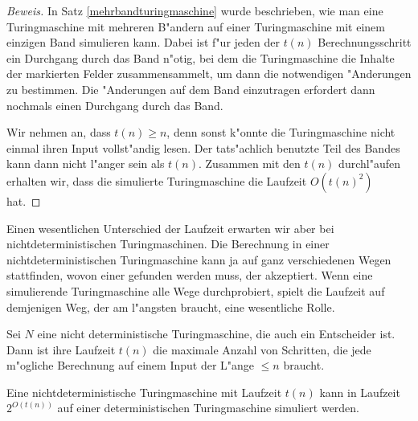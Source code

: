 \begin{proof}[Beweis]
In Satz \ref{mehrbandturingmaschine} wurde beschrieben, wie man eine
Turingmaschine mit mehreren B"andern auf einer Turingmaschine mit
einem einzigen Band simulieren kann. Dabei ist f"ur jeden der
$t(n)$ Berechnungsschritt ein Durchgang durch das Band n"otig, bei
dem die Turingmaschine die Inhalte der markierten Felder zusammensammelt,
um dann die notwendigen "Anderungen zu bestimmen. Die "Anderungen
auf dem Band einzutragen erfordert dann nochmals einen Durchgang
durch das Band.

Wir nehmen an, dass $t(n)\ge n$, denn sonst k"onnte die
Turingmaschine nicht einmal ihren Input vollst"andig lesen.
Der tats"achlich benutzte Teil des Bandes kann dann nicht l"anger sein
als $t(n)$. Zusammen mit den $t(n)$ durchl"aufen erhalten wir,
dass die simulierte Turingmaschine die Laufzeit $O(t(n)^2)$ hat.
\end{proof}

Einen wesentlichen Unterschied der Laufzeit erwarten wir aber
bei nichtdeterministischen Turingmaschinen.
Die Berechnung in einer nichtdeterministischen Turingmaschine
kann ja auf ganz verschiedenen Wegen stattfinden, wovon
einer gefunden werden muss, der akzeptiert. Wenn eine simulierende
Turingmaschine alle Wege durchprobiert, spielt die Laufzeit auf
demjenigen Weg, der am l"angsten braucht, eine wesentliche Rolle.

\begin{definition}
Sei $N$ eine nicht deterministische Turingmaschine, die auch ein
Entscheider ist. Dann ist ihre Laufzeit $t(n)$ die maximale Anzahl
von Schritten, die jede m"ogliche Berechnung auf einem Input der
L"ange $\le n$ braucht.
\end{definition}

\begin{satz}
\label{exponentialtime}
Eine nichtdeterministische Turingmaschine mit Laufzeit $t(n)$
kann in Laufzeit $2^{O(t(n))}$
auf einer deterministischen Turingmaschine simuliert werden.
\end{satz}

